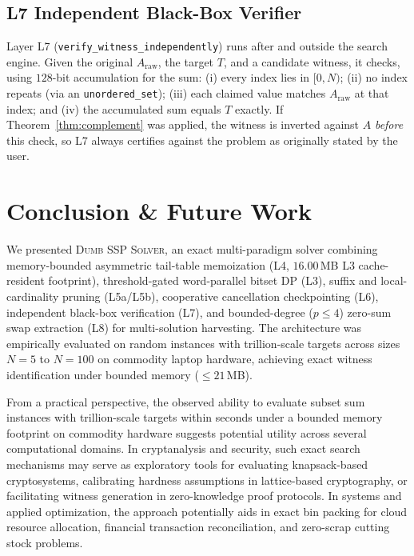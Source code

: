 \documentclass[journal,onecolumn,11pt]{IEEEtran}
\begin{document}
\subsection{L7 Independent Black-Box Verifier}
Layer L7 (\texttt{verify\_witness\_independently}) runs after and outside the search engine. Given the original $A_{\text{raw}}$, the target $T$, and a candidate witness, it checks, using $128$-bit accumulation for the sum: (i) every index lies in $[0,N)$; (ii) no index repeats (via an \texttt{unordered\_set}); (iii) each claimed value matches $A_{\text{raw}}$ at that index; and (iv) the accumulated sum equals $T$ exactly. If Theorem~\ref{thm:complement} was applied, the witness is inverted against $A$ \emph{before} this check, so L7 always certifies against the problem as originally stated by the user.

\section{Conclusion \& Future Work}
\label{sec:conclusion}

We presented \textsc{Dumb SSP Solver}, an exact multi-paradigm solver combining memory-bounded asymmetric tail-table memoization (L4, $16.00$\,MB L3 cache-resident footprint), threshold-gated word-parallel bitset DP (L3), suffix and local-cardinality pruning (L5a/L5b), cooperative cancellation checkpointing (L6), independent black-box verification (L7), and bounded-degree ($p\le4$) zero-sum swap extraction (L8) for multi-solution harvesting. The architecture was empirically evaluated on random instances with trillion-scale targets across sizes $N=5$ to $N=100$ on commodity laptop hardware, achieving exact witness identification under bounded memory ($\le 21$\,MB).

From a practical perspective, the observed ability to evaluate subset sum instances with trillion-scale targets within seconds under a bounded memory footprint on commodity hardware suggests potential utility across several computational domains. In cryptanalysis and security, such exact search mechanisms may serve as exploratory tools for evaluating knapsack-based cryptosystems, calibrating hardness assumptions in lattice-based cryptography, or facilitating witness generation in zero-knowledge proof protocols. In systems and applied optimization, the approach potentially aids in exact bin packing for cloud resource allocation, financial transaction reconciliation, and zero-scrap cutting stock problems.
\end{document}
